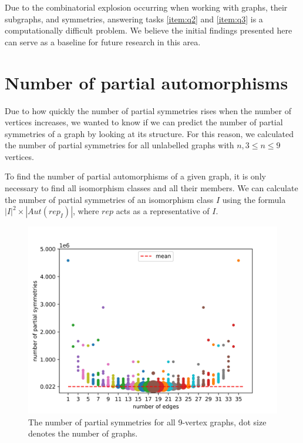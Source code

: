 Due to the combinatorial explosion occurring when working with graphs, their subgraphs, and symmetries, answering tasks \ref{item:q2} and \ref{item:q3} is a computationally difficult problem. We believe the initial findings presented here can serve as a baseline for future research in this area.

\section{Number of partial automorphisms}

Due to how quickly the number of partial symmetries rises when the number of vertices increases, we wanted to know if we can predict the number of partial symmetries of a graph by looking at its structure. For this reason, we calculated the number of partial symmetries for all unlabelled graphs with $n, 3 \leq n \leq 9$ vertices.

To find the number of partial automorphisms of a given graph, it is only necessary to find all isomorphism classes and all their members. We can calculate the number of partial symmetries of an isomorphism class $I$ using the formula $|I|^2 \times |Aut(rep_I)|$, where $rep$ acts as a representative of $I$.

\begin{figure}[H]
\centering
\includegraphics[scale=0.8,keepaspectratio]{images/9_vertices_minus_complete.jpg}
\caption{The number of partial symmetries for all 9-vertex graphs, dot size denotes the number of graphs.}
\label{fig:partial9}
\end{figure}

